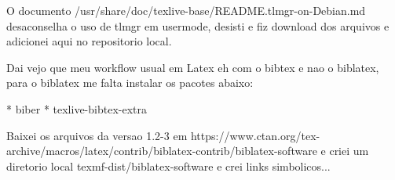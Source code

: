 \documentclass{article}
\begin{document}

O documento /usr/share/doc/texlive-base/README.tlmgr-on-Debian.md desaconselha o uso de tlmgr em usermode, desisti e fiz download
dos arquivos e adicionei aqui no repositorio local.

Dai vejo que meu workflow usual em Latex eh com o bibtex e nao o biblatex, para o biblatex me falta instalar os pacotes abaixo:

* biber
* texlive-bibtex-extra

Baixei os arquivos da versao 1.2-3 em https://www.ctan.org/tex-archive/macros/latex/contrib/biblatex-contrib/biblatex-software
e criei um diretorio local texmf-dist/biblatex-software e crei links simbolicos...

%
%

\printbibliography
\end{document}
